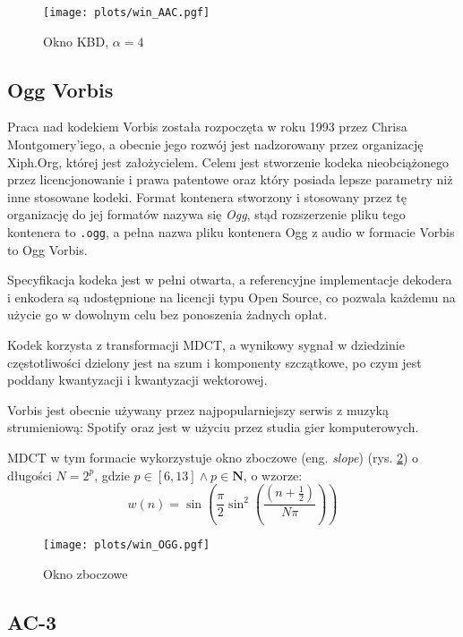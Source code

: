 \documentclass[pl,12pt]{aghdpl}
\let\Oldsubsection\subsection%
\renewcommand{\subsection}{\FloatBarrier\Oldsubsection}
\begin{document}
\begin{figure}[!tbh]
  \centering
  \texttt{[image: plots/win\_AAC.pgf]}
  \caption{Okno KBD, $\alpha = 4$}
  \label{fig:win_AAC}
\end{figure}

\subsection{Ogg Vorbis}

Praca nad kodekiem Vorbis została rozpoczęta w roku 1993 przez Chrisa
Montgomery'iego, a obecnie jego rozwój jest nadzorowany przez organizację
Xiph.Org, której jest założycielem. Celem jest stworzenie kodeka nieobciążonego
przez licencjonowanie i prawa patentowe oraz który posiada lepsze parametry niż
inne stosowane kodeki. Format kontenera stworzony i stosowany przez tę
organizację do jej formatów nazywa się \textit{Ogg}, stąd rozszerzenie pliku
tego kontenera to \lstinline|.ogg|, a pełna nazwa pliku kontenera Ogg z audio w
formacie Vorbis to Ogg Vorbis.

Specyfikacja kodeka jest w pełni otwarta, a referencyjne implementacje dekodera
i enkodera są udostępnione na licencji typu Open Source, co pozwala każdemu na
użycie go w dowolnym celu bez ponoszenia żadnych opłat.

Kodek korzysta z transformacji MDCT, a wynikowy sygnał w dziedzinie
częstotliwości dzielony jest na szum i komponenty szczątkowe, po czym jest
poddany kwantyzacji i kwantyzacji wektorowej.

Vorbis jest obecnie używany przez najpopularniejszy serwis z muzyką
strumieniową: Spotify oraz jest w użyciu przez studia gier komputerowych.

MDCT w tym formacie wykorzystuje okno zboczowe (eng. \textit{slope}) (rys.
\ref{fig:win_OGG}) o długości $N = 2^{p}$, gdzie $p \in [6,13] \land p \in \bm N$, o wzorze:
\begin{equation}\label{eq:slope_win}
  w(n) = \sin\left(\frac{\pi}{2}\sin^2\left(\frac{\left(n +
  \frac{1}{2}\right)}{N\pi}\right)\right)
\end{equation}
\begin{figure}[!tbh]
  \centering
  \texttt{[image: plots/win\_OGG.pgf]}
  \caption{Okno zboczowe}
  \label{fig:win_OGG}
\end{figure}

\subsection{AC-3}
\end{document}
